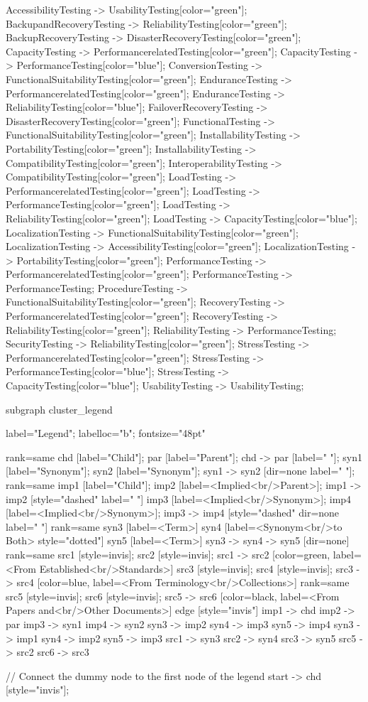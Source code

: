 \documentclass{article}
\begin{document}
{AccessibilityTesting -> UsabilityTesting[color="green"];
BackupandRecoveryTesting -> ReliabilityTesting[color="green"];
BackupRecoveryTesting -> DisasterRecoveryTesting[color="green"];
CapacityTesting -> PerformancerelatedTesting[color="green"];
CapacityTesting -> PerformanceTesting[color="blue"];
ConversionTesting -> FunctionalSuitabilityTesting[color="green"];
EnduranceTesting -> PerformancerelatedTesting[color="green"];
EnduranceTesting -> ReliabilityTesting[color="blue"];
FailoverRecoveryTesting -> DisasterRecoveryTesting[color="green"];
FunctionalTesting -> FunctionalSuitabilityTesting[color="green"];
InstallabilityTesting -> PortabilityTesting[color="green"];
InstallabilityTesting -> CompatibilityTesting[color="green"];
InteroperabilityTesting -> CompatibilityTesting[color="green"];
LoadTesting -> PerformancerelatedTesting[color="green"];
LoadTesting -> PerformanceTesting[color="green"];
LoadTesting -> ReliabilityTesting[color="green"];
LoadTesting -> CapacityTesting[color="blue"];
LocalizationTesting -> FunctionalSuitabilityTesting[color="green"];
LocalizationTesting -> AccessibilityTesting[color="green"];
LocalizationTesting -> PortabilityTesting[color="green"];
PerformanceTesting -> PerformancerelatedTesting[color="green"];
PerformanceTesting -> PerformanceTesting;
ProcedureTesting -> FunctionalSuitabilityTesting[color="green"];
RecoveryTesting -> PerformancerelatedTesting[color="green"];
RecoveryTesting -> ReliabilityTesting[color="green"];
ReliabilityTesting -> PerformanceTesting;
SecurityTesting -> ReliabilityTesting[color="green"];
StressTesting -> PerformancerelatedTesting[color="green"];
StressTesting -> PerformanceTesting[color="blue"];
StressTesting -> CapacityTesting[color="blue"];
UsabilityTesting -> UsabilityTesting;

subgraph cluster_legend {

    label="Legend";
    labelloc="b";
    fontsize="48pt"

    {
        rank=same
        chd [label="Child"];
        par [label="Parent"];
        chd -> par [label="                "];
        syn1 [label="Synonym"];
        syn2 [label="Synonym"];
        syn1 -> syn2 [dir=none label="                "];
    }
    {
        rank=same
        imp1 [label="Child"];
        imp2 [label=<Implied<br/>Parent>];
        imp1 -> imp2 [style="dashed" label="                "]
        imp3 [label=<Implied<br/>Synonym>];
        imp4 [label=<Implied<br/>Synonym>];
        imp3 -> imp4 [style="dashed" dir=none label="                "]
    }
    {
        rank=same
        syn3 [label=<Term>]
        syn4 [label=<Synonym<br/>to Both> style="dotted"]
        syn5 [label=<Term>]
        syn3 -> syn4 -> syn5 [dir=none]
    }
{
rank=same
src1 [style=invis];
src2 [style=invis];
src1 -> src2 [color=green, label=<From Established<br/>Standards>]
src3 [style=invis];
src4 [style=invis];
src3 -> src4 [color=blue, label=<From Terminology<br/>Collections>]
}
{
rank=same
src5 [style=invis];
src6 [style=invis];
src5 -> src6 [color=black, label=<From Papers and<br/>Other Documents>]
}
edge [style="invis"]
imp1 -> chd
imp2 -> par
imp3 -> syn1
imp4 -> syn2
syn3 -> imp2
syn4 -> imp3
syn5 -> imp4
syn3 -> imp1
syn4 -> imp2
syn5 -> imp3
src1 -> syn3
src2 -> syn4
src3 -> syn5
src5 -> src2
src6 -> src3
}

// Connect the dummy node to the first node of the legend
start -> chd [style="invis"];
}
\end{document}
